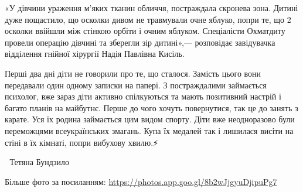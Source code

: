 «У дівчини ураження м'яких тканин обличчя, постраждала скронева зона. Дитині
дуже пощастило, що осколки дивом не травмували очне яблуко, попри те, що 2
осколки ввійшли між стінкою орбіти і очним яблуком. Спеціалісти Охматдиту
провели операцію дівчині та зберегли зір дитині»,— розповідає завідувачка
відділення гнійної хірургії Надія Павлівна Кисіль.🏥

Перші два дні діти не говорили про те, що сталося. Замість цього вони
передавали один одному записки на папері. З постраждалими займається психолог,
вже зараз діти активно спілкуються та мають позитивний настрій і багато планів
на майбутнє. Перше до чого хочуть повернутися, так це до занять з карате. Уся
їх родина займається цим видом спорту. Діти вже неодноразово були переможцями
всеукраїнських змагань. Купа їх медалей так і лишилася висіти на стіні в їх
кімнаті, попри вибухову хвилю.⚡️

📸 Тетяна Бундзило 

Більше фото за посиланням: \url{https://photos.app.goo.gl/8b2wJjgyuDjipuPg7}


